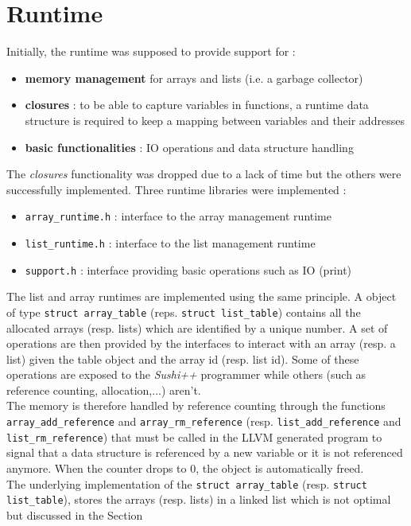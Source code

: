 \documentclass[a4paper,11pt]{article}
\begin{document}
\section{Runtime}
\label{sec:runtime}
Initially, the runtime was supposed to provide support for :
\begin{itemize}
	\item \textbf{memory management} for arrays and lists (i.e. a garbage collector)
	\item \textbf{closures} : to be able to capture variables in functions, a runtime data structure is required to keep a mapping between variables and their addresses
	\item \textbf{basic functionalities} : IO operations and data structure handling
\end{itemize}
The \textit{closures} functionality was dropped due to a lack of time but the others were successfully implemented. Three runtime libraries were implemented :
\begin{itemize}
	\item \texttt{array\_runtime.h} : interface to the array management runtime  
	\item \texttt{list\_runtime.h} : interface to the list management runtime
	\item \texttt{support.h} : interface providing basic operations such as IO (print)
\end{itemize}
The list and array runtimes are implemented using the same principle. A object of type \texttt{struct array\_table} (reps. \texttt{struct list\_table}) contains all the allocated arrays (resp. lists) which are identified by a unique number. A set of operations are then provided by the interfaces to interact with an array (resp. a list) given the table object and the array id (resp. list id). Some of these operations are exposed to the \textit{Sushi++} programmer while others (such as reference counting, allocation,...) aren't.
\\
The memory is therefore handled by reference counting through the functions \texttt{array\_add\_reference} and \texttt{array\_rm\_reference} (resp. \texttt{list\_add\_reference} and \texttt{list\_rm\_reference}) that must be called in the LLVM generated program to signal that a data structure is referenced by a new variable or it is not referenced anymore. When the counter drops to 0, the object is automatically freed.
\\
The underlying implementation of the \texttt{struct array\_table} (resp. \texttt{struct list\_table}), stores the arrays (resp. lists) in a linked list which is not optimal but discussed in the Section \
\end{document}
